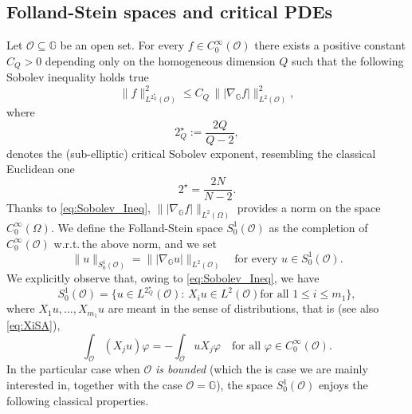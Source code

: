 \documentclass[11pt]{amsart}
\numberwithin{equation}{section} %
\theoremstyle{definition}
\begin{document}
\medskip

\subsection{Folland-Stein spaces and critical PDEs}\label{sec:fsandpdes}
Let $\mathcal{O} \subseteq \mathbb{G}$ be an open set.
For every $f \in C^{\infty}_{0}(\mathcal{O})$ there exists a positive constant $C_Q>0$ depending only on the homogeneous dimension $Q$ such that the following Sobolev inequality holds true
\begin{equation}\label{eq:Sobolev_Ineq}
	\|f\|^{2}_{L^{2_{Q}^{\star}}(\mathcal{O})} \leq C_{Q} \, \| |\nabla_{\mathbb{G}}f| \|^{2}_{L^{2}(\mathcal{O})},
\end{equation}
\noindent where 
\begin{equation}
	2_{Q}^{\star} := \dfrac{2Q}{Q-2},
\end{equation}
\noindent denotes the (sub-elliptic) critical Sobolev exponent, resembling the classical Euclidean 
one
$$2^{\star}=\frac{2N}{N-2}.$$
Thanks to \eqref{eq:Sobolev_Ineq}, 
$\| |\nabla_{\mathbb{G}}f| \|_{L^{2}(\Omega)}$ provides a norm on the space $C^{\infty}_{0}(\Omega)$.
We define the Folland-Stein space $S^{1}_{0}(\mathcal{O})$ as the completion of $C^{\infty}_{0}(\mathcal{O})$ w.r.t.\,the above norm, and we set
$$\|u\|_{S^{1}_{0}(\mathcal{O})} = \||\nabla_\mathbb{G}u|\|_{L^2(\mathcal{O})}
\quad\text{for every $u\in S^{1}_{0}(\mathcal{O})$}.$$
We explicitly observe that, owing to \eqref{eq:Sobolev_Ineq}, we have
\begin{equation} \label{eq:explicitS01def}
 S_0^1(\mathcal{O}) = \big\{u\in L^{2_{Q}^{\star}}(\mathcal{O}):\,\text{$X_iu\in L^2(\mathcal{O})$
 for all $1\leq i\leq m_1$}\big\},
\end{equation}
where $X_1u,\ldots,X_{m_1}u$ are meant in the sense of distributions, that is (see also \eqref{eq:XiSA}),
$$\int_{\mathcal{O}}(X_ju)\varphi = -\int_{\mathcal{O}}uX_j\varphi\quad\text{for all $\varphi\in C_0^\infty(\mathcal{O})$}.$$
In the particular case when $\mathcal{O}$ \emph{is bounded} (which the is case we are mainly
interested in, together with the case $\mathcal{O} = \mathbb{G}$),
the space $S_0^1(\mathcal{O})$ enjoys the following classical properties.
\end{document}
